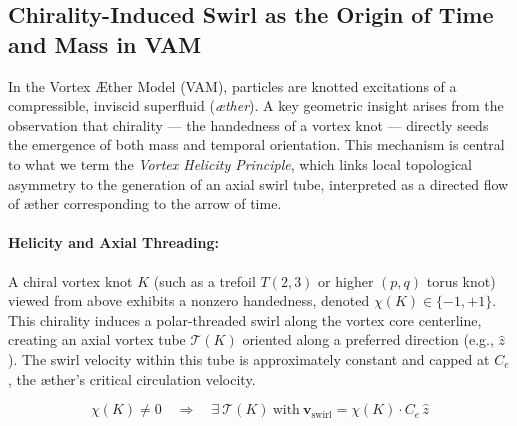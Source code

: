 \subsection{Chirality-Induced Swirl as the Origin of Time and Mass in VAM}

In the Vortex Æther Model (VAM), particles are knotted excitations of a compressible, inviscid superfluid (\emph{æther}). A key geometric insight arises from the observation that chirality --- the handedness of a vortex knot --- directly seeds the emergence of both mass and temporal orientation. This mechanism is central to what we term the \emph{Vortex Helicity Principle}, which links local topological asymmetry to the generation of an axial swirl tube, interpreted as a directed flow of æther corresponding to the arrow of time.

\paragraph{Helicity and Axial Threading:}
A chiral vortex knot $K$ (such as a trefoil $T(2,3)$ or higher $(p,q)$ torus knot) viewed from above exhibits a nonzero handedness, denoted $\chi(K) \in \{-1, +1\}$. This chirality induces a polar-threaded swirl along the vortex core centerline, creating an axial vortex tube $\mathcal{T}(K)$ oriented along a preferred direction (e.g., $\hat{z}$). The swirl velocity within this tube is approximately constant and capped at $C_e$, the æther’s critical circulation velocity.

\begin{equation}
    \chi(K) \neq 0 \quad \Rightarrow \quad \exists~\mathcal{T}(K)~\text{with}~\mathbf{v}_{\text{swirl}} = \chi(K) \cdot C_e \, \hat{z}
\end{equation}

